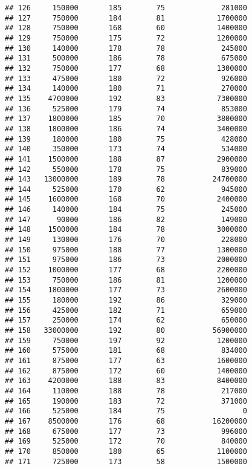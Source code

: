 \documentclass[
]{article}
\begin{document}
\begin{verbatim}
## 126     150000       185        75             281000
## 127     750000       184        81            1700000
## 128     750000       168        60            1400000
## 129     750000       175        72            1200000
## 130     140000       178        78             245000
## 131     500000       186        78             675000
## 132     750000       177        68            1300000
## 133     475000       180        72             926000
## 134     140000       180        71             270000
## 135    4700000       192        83            7300000
## 136     525000       179        74             853000
## 137    1800000       185        70            3800000
## 138    1800000       186        74            3400000
## 139     180000       180        75             428000
## 140     350000       173        74             534000
## 141    1500000       188        87            2900000
## 142     550000       178        75             839000
## 143   13000000       189        78           24700000
## 144     525000       170        62             945000
## 145    1600000       168        70            2400000
## 146     140000       184        75             245000
## 147      90000       186        82             149000
## 148    1500000       184        78            3000000
## 149     130000       176        70             228000
## 150     975000       188        77            1300000
## 151     975000       186        73            2000000
## 152    1000000       177        68            2200000
## 153     750000       186        81            1200000
## 154    1800000       177        73            2600000
## 155     180000       192        86             329000
## 156     425000       182        71             659000
## 157     250000       174        62             650000
## 158   33000000       192        80           56900000
## 159     750000       197        92            1200000
## 160     575000       181        68             834000
## 161     875000       177        63            1600000
## 162     875000       172        60            1400000
## 163    4200000       188        83            8400000
## 164     110000       188        78             217000
## 165     190000       183        72             371000
## 166     525000       184        75                  0
## 167    8500000       176        68           16200000
## 168     675000       177        73             996000
## 169     525000       172        70             840000
## 170     850000       180        65            1100000
## 171     725000       173        58            1500000

\end{verbatim}
\end{document}
